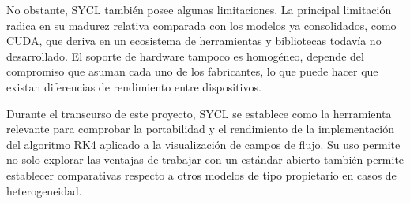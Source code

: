No obstante, SYCL también posee algunas limitaciones. La principal limitación radica en su madurez relativa comparada con los modelos ya consolidados, como CUDA, que deriva en un ecosistema de herramientas y bibliotecas todavía no desarrollado. El soporte de hardware tampoco es homogéneo, depende del compromiso que asuman cada uno de los fabricantes, lo que puede hacer que existan diferencias de rendimiento entre dispositivos.

Durante el transcurso de este proyecto, SYCL se establece como la herramienta relevante para comprobar la portabilidad y el rendimiento de la implementación del algoritmo RK4 aplicado a la visualización de campos de flujo. Su uso permite no solo explorar las ventajas de trabajar con un estándar abierto también permite establecer comparativas respecto a otros modelos de tipo propietario en casos de heterogeneidad.
